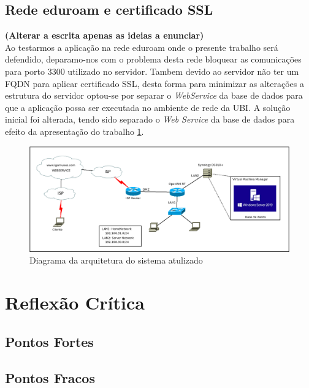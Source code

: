 \subsection{Rede \ac{eduroam} e certificado \ac{SSL}}
\label{chap4:subsec:eduroam}

\textbf{(Alterar a escrita apenas as ideias a enunciar)}\\
Ao testarmos a aplicação na rede \ac{eduroam} onde o presente trabalho será defendido, deparamo-nos com o problema desta rede bloquear as comunicações para porto 3300 utilizado no servidor.
Tambem devido ao servidor não ter um \ac{FQDN} para aplicar certificado \ac{SSL}, desta forma para minimizar as alterações a estrutura do servidor optou-se por separar o \emph{WebService} da base de dados para que a aplicação possa ser executada no ambiente de rede da \ac{UBI}.
A solução inicial foi alterada, tendo sido separado o \textit{Web Service} da base de dados para efeito da apresentação do trabalho \ref{fig::diagrama-sistema-new}.

\begin{figure}[!htbp]
	\centering
	\includegraphics[scale=0.325]{Imagens/DiagramaActual.png}	\caption[Diagrama da arquitetura do sistema atulizado]{Diagrama da arquitetura do sistema atulizado}
	\label{fig::diagrama-sistema-new}
\end{figure}

\section{Reflexão Crítica}
\label{chap4:sec:reflexao}

\subsection{Pontos Fortes}
\label{chap4:subsec:pontosfortes}

\subsection{Pontos Fracos}
\label{chap4:subsec:pontosfracos}

